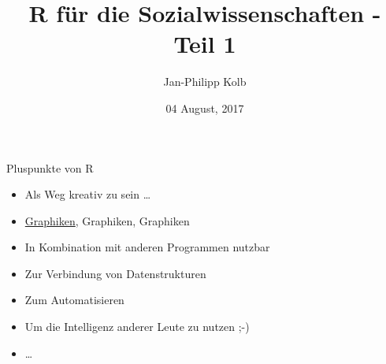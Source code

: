 \documentclass[ignorenonframetext,]{beamer}
\title{R für die Sozialwissenschaften - Teil 1}
\author{Jan-Philipp Kolb}
\date{04 August, 2017}
\providecommand{\tightlist}{%
\setlength{\itemsep}{0pt}\setlength{\parskip}{0pt}}
\begin{document}
\frame{\titlepage}

\begin{frame}

\begin{block}{Pluspunkte von R}

\begin{itemize}
\tightlist
\item
  Als Weg kreativ zu sein \ldots{}
\item
  \href{http://www.sr.bham.ac.uk/~ajrs/R/r-gallery.html}{Graphiken},
  Graphiken, Graphiken
\item
  In Kombination mit anderen Programmen nutzbar
\item
  Zur Verbindung von Datenstrukturen
\item
  Zum Automatisieren
\item
  Um die Intelligenz anderer Leute zu nutzen ;-)
\item
  \ldots{}
\end{itemize}

\end{block}

\end{frame}
\end{document}
